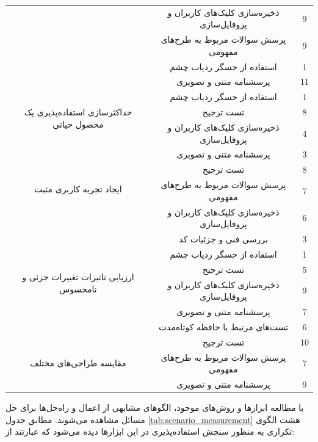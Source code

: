 \begin{table}[H]
\begin{tabular}{|c|c|c|}
		& ذخیره‌سازی کلیک‌های کاربران و پروفایل‌سازی & 9 \\ \cline{2-3} 
		& پرسش سوالات مربوط به طرح‌های مفهومی & 9 \\ \cline{2-3} 
		& استفاده از حسگر ردیاب چشم & 1 \\ \cline{2-3} 
		& پرسشنامه متنی و تصویری & 11 \\ \hline
		\multirow{3}{*}{حداکثرسازی استفاده‌پذیری یک محصول حیاتی} & استفاده از حسگر ردیاب چشم & 1 \\ \cline{2-3} 
		& تست ترجیح & 8 \\ \cline{2-3} 
		& ذخیره‌سازی کلیک‌های کاربران و پروفایل‌سازی & 4 \\ \hline
		\multirow{4}{*}{ایجاد تجربه کاربری مثبت} & پرسشنامه متنی و تصویری & 3 \\ \cline{2-3} 
		& تست ترجیح & 8 \\ \cline{2-3} 
		& پرسش سوالات مربوط به طرح‌های مفهومی & 7 \\ \cline{2-3} 
		& ذخیره‌سازی کلیک‌های کاربران و پروفایل‌سازی & 6 \\ \hline
		\multirow{6}{*}{ارزیابی تاثیرات تغییرات جزئی و نامحسوس} & بررسی فنی و جزئیات کد & 3 \\ \cline{2-3} 
		& استفاده از حسگر ردیاب چشم & 1 \\ \cline{2-3} 
		& تست ترجیح & 5 \\ \cline{2-3} 
		& ذخیره‌سازی کلیک‌های کاربران و پروفایل‌سازی & 9 \\ \cline{2-3} 
		& پرسشنامه متنی و تصویری & 7 \\ \cline{2-3} 
		& تست‌های مرتبط با حافظه کوتاه‌مدت & 6 \\ \hline
		\multirow{3}{*}{مقایسه طراحی‌های مختلف} & تست ترجیح & 10 \\ \cline{2-3} 
		& پرسش سوالات مربوط به طرح‌های مفهومی & 7 \\ \cline{2-3} 
		& پرسشنامه متنی و تصویری & 9 \\ \hline
	\end{tabular}
\end{table}
با مطالعه ابزارها و روش‌های موجود، الگوهای مشابهی از اعمال و راه‌حل‌ها برای حل مسائل مشاهده می‌شوند. مطابق جدول
\ref{tab:scenario_measurement}
هشت الگوی تکراری به منظور سنجش استفاده‌پذیری در این ابزارها دیده می‌شود که عبارتند از:
